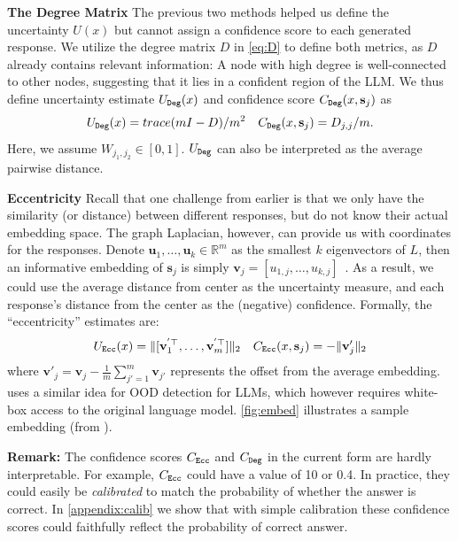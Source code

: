 \textbf{The Degree Matrix}
The previous two methods helped us define the uncertainty $U(x)$ but cannot assign a confidence score to each generated response.
We utilize the degree matrix $D$ in \cref{eq:D} to define both metrics, as  $D$ already contains relevant information: A node with high degree is well-connected to other nodes, suggesting that it lies in a confident region of the LLM. 
We thus define uncertainty estimate $U_{\texttt{Deg}}(x)$ and confidence score $C_{\texttt{Deg}}(x, \mathbf{s}_j) $ as
\begin{align}
    &U_{\texttt{Deg}}(x) = trace(mI-D)/m^2
    &C_{\texttt{Deg}}(x, \mathbf{s}_j) = D_{j,j}/m.
\end{align}
Here, we assume $W_{j_1,j_2}\in[0,1]$.
$U_{\texttt{Deg}}$ can also be interpreted as the average pairwise distance. 


\textbf{Eccentricity}
Recall that one challenge from earlier is that we only have the similarity (or distance) between different responses, but do not know their actual embedding space.
The graph Laplacian, however, can provide us with coordinates for the responses.
Denote $\mathbf{u}_1, \ldots, \mathbf{u}_k\in\mathbb{R}^m$ as the smallest $k$ eigenvectors of $L$, then an informative embedding of $\mathbf{s}_j$ is simply $\mathbf{v}_j = [u_{1,j},\ldots,u_{k,j}]$~\citep{NIPS2001_801272ee,von2007tutorial}.
As a result, we could use the average distance from center as the uncertainty measure, and each response's distance from the center as the (negative) confidence. 
Formally, the ``eccentricity'' estimates are:
\begin{align}
    & U_{\texttt{Ecc}}(x) = \|[\mathbf{v}^{'\top}_1, \ldots, \mathbf{v}^{'\top}_m]\|_2 
    & C_{\texttt{Ecc}}(x, \mathbf{s}_j) = -\|\mathbf{v}'_j\|_2
\end{align}
where $\mathbf{v}'_j = \mathbf{v}_j - \frac{1}{m}\sum_{j'=1}^m \mathbf{v}_{j'}$ represents the offset from the average embedding.
\cite{ren2023outofdistribution} uses a similar idea for OOD detection for LLMs, which however requires white-box access to the original language model.
\cref{fig:embed} illustrates a sample embedding (from \datasetcoqa).

\textbf{Remark:}
The confidence scores $C_{\texttt{Ecc}}$ and $C_{\texttt{Deg}}$ in the current form are hardly interpretable.
For example, $C_{\texttt{Ecc}}$ could have a value of 10 or 0.4.
In practice, they could easily be \textit{calibrated} to match the probability of whether the answer is correct.
In \cref{appendix:calib} we show that with simple calibration these confidence scores could faithfully reflect the probability of correct answer.

